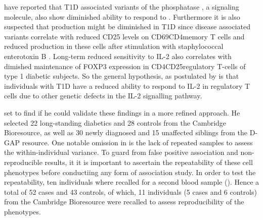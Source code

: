 \citet{Long:2011hk} have reported that \Gls{T1D} associated variants of the phosphatase , a signaling molecule, also show diminished ability
to respond to .
Furthermore it is also suspected that  production might be diminished in T1D since disease associated  variants 
correlate with reduced CD25 levels on CD69\positive CD4\positive memory T cells
and reduced  production in these cells after stimulation with staphylococcal enterotoxin B \citep{Dendrou:2009dv}.
Long-term reduced sensitivity to IL-2 also correlates with dimished maintenance 
of FOXP3 expression in CD4\positive CD25\positive regulatory T-cells of type 1 diabetic subjects.
So the general hypothesis, as postulated by \citet{Long:2010ej,Long:2012ea} is that individuals with T1D have a reduced ability to respond to IL-2
in regulatory T cells
due to other genetic defects in the IL-2 signalling pathway.

 set to find if he could validate these findings in a more refined approach.
He selected 22 long-standing diabetics and 28 controls from the Cambridge Bioresource, as well as 
30 newly diagnosed and 15 unaffected siblings from the \Gls{D-GAP} resource.  
One notable omission in \citet{Long:2010ej} is the lack of repeated samples to assess the within-individual variance.
To guard from false positive association and non-reproducible results, it
it is important to ascertain the repeatability of these cell phenotypes before conductiing any form of association study.
In order to test the repeatability, ten individuals where recalled for a second blood sample ().
Hence a total of 52 cases and 43 controls, of which, 11 individuals (5 cases and 6 controls) from the Cambridge Bioresource were recalled to assess reproducibility of the phenotypes.


